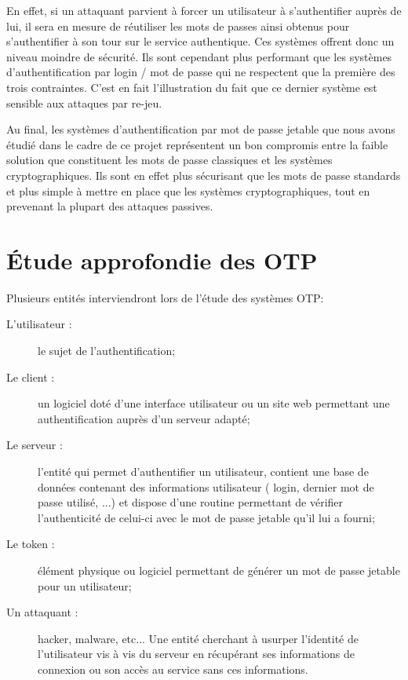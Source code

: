 	En effet, si un attaquant parvient à forcer un utilisateur à
	s'authentifier auprès de lui, il sera en mesure de réutiliser les mots de
	passes ainsi obtenus pour s'authentifier à son tour sur le service
	authentique. Ces systèmes offrent donc un niveau moindre de sécurité. Ils
	sont cependant plus performant que les systèmes d'authentification par
	login / mot de passe qui ne respectent que la première des trois
	contraintes. C'est en fait l'illustration du fait que ce dernier système
	est sensible aux attaques par re-jeu.

	Au final, les systèmes d'authentification par mot de passe jetable que
	nous avons étudié dans le cadre de ce projet représentent un bon compromis
	entre la faible solution que constituent les mots de passe classiques et
	les systèmes cryptographiques. Ils sont en effet plus sécurisant que les
	mots de passe standards et plus simple à mettre en place que les systèmes
	cryptographiques, tout en prevenant la plupart des attaques passives.

\section{Étude approfondie des OTP}

	Plusieurs entités interviendront lors de l'étude des systèmes OTP:

	\begin{description}
		\item[L'utilisateur :] le sujet de l'authentification;
		\item[Le client :] un logiciel doté d'une interface utilisateur ou un
		site web permettant une authentification auprès d'un serveur adapté;
		\item[Le serveur :] l'entité qui permet d'authentifier un utilisateur,
		contient une base de données contenant des informations utilisateur (
		login, dernier mot de passe utilisé, ...) et dispose d'une routine
		permettant de vérifier l'authenticité de celui-ci avec le mot de passe
		jetable qu'il lui a fourni;
		\item[Le token :] élément physique ou logiciel permettant de générer
		un mot de passe jetable pour un utilisateur;
		\item[Un attaquant :] hacker, malware, etc... Une entité cherchant à
		usurper l'identité de l'utilisateur vis à vis du serveur en récupérant
		ses informations de connexion ou son accès au service sans ces
		informations.
	\end{description}

